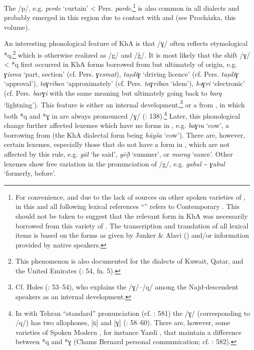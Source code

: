 \documentclass[output=paper,nonflat]{langsci/langscibook}
\begin{document}
The  /p/, e.g. \textit{perde} ‘curtain’ < Pers. \textit{parde},\footnote{For convenience, and due to the lack of sources on other spoken varieties of , in this and all following lexical references ``'' refers to Contemporary  . This should not be taken to suggest that the relevant form in KhA was necessarily borrowed from this variety of . The transcription and translation of all  lexical items is based on the forms as given by Junker \& Alavi (\citeyear{JunkerAlavi2002}) and/or information provided by native speakers.} is also common in all  dialects and probably emerged in this region due to contact with  and  (see Procházka, this volume). 

An interesting phonological feature of KhA is that /ɣ/ often reflects etymological *q,\footnote{This phenomenon is also documented for the  dialects of Kuwait, Qatar, and the United  Emirates (\citealt{Holes2016}: 54, fn. 5).} which is otherwise realized as /g/ and /ǧ/. It is most likely that the shift /ɣ/ < *q first occurred in KhA forms borrowed from  but ultimately of  origin, e.g. \textit{ɣisma} ‘part, section’ (cf. Pers. \textit{ɣesmat}), \textit{taṣdīɣ} ‘driving licence’ (cf. Pers. \textit{taṣdīɣ} `approval'), \textit{taɣrīban} ‘approximately’ (cf. Pers. \textit{taɣrīban} `idem'), \textit{bəɣri} ‘electronic’ (cf. Pers. \textit{barɣi} with the same meaning but ultimately going back to  \textit{barq} ‘lightning’). This feature is either an internal development,\footnote{Cf. Holes (\citeyear{Holes2016}: 53–54), who explains the /ɣ/–/q/  among the Najd-descendent   speakers as an internal development.} or a  from , in which both *q and *ɣ in   are always pronounced /ɣ/ (\citealt{MatrasShabibi2007}: 138).\footnote{In   with Tehran ``standard'' pronunciation (cf. \citealt{Paul2018}: 581) the  /ɣ/ (corresponding to  /q/) has two allophones, [ɢ] and [ɣ] (\citealt{Majidi1986}: 58–60). There are, however, some varieties of Spoken Modern , for instance Yazdi , that maintain a difference between *q and *ɣ (Chams Bernard  personal communication; cf. \citealt{Paul2018}: 582).} Later, this phonological change further affected lexemes which have no  forms in , e.g. \textit{baɣra} `cow', a borrowing from   (the KhA dialectal form being \textit{hāyša} `cow'). There are, however, certain lexemes, especially those that do not have a  form in , which are not affected by this rule, e.g. \textit{gāl} `he said', \textit{gēð̣} ‘summer’, or \textit{marag} ‘sauce’. Other lexemes show free variation in the pronunciation of /g/, e.g. \textit{gabul} \~{} \textit{ɣabul} `formerly, before'.
\end{document}
